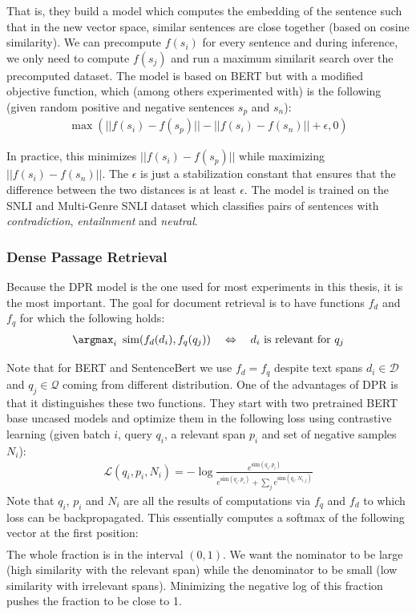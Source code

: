 That is, they build a model which computes the embedding of the sentence such that in the new vector space, similar sentences are close together (based on cosine similarity).
We can precompute $f(s_i)$ for every sentence and during inference, we only need to compute $f(s_j)$ and run a maximum similarit search over the precomputed dataset.
The model is based on BERT but with a modified objective function, which (among others experimented with) is the following (given random positive and negative sentences $s_p$ and $s_n$):
\begin{gather*}
    \max(||f(s_i)-f(s_p)||-||f(s_i)-f(s_n)||+\epsilon, 0)
\end{gather*}

In practice, this minimizes $||f(s_i)-f(s_p)||$ while maximizing $||f(s_i)-f(s_n)||$.
The $\epsilon$ is just a stabilization constant that ensures that the difference between the two distances is at least $\epsilon$.
The model is trained on the SNLI and Multi-Genre SNLI dataset which classifies pairs of sentences with \emph{contradiction}, \emph{entailnment} and \emph{neutral}. 

\subsubsection*{Dense Passage Retrieval}

Because the DPR model is the one used for most experiments in this thesis, it is the most important.
The goal for document retrieval is to have functions $f_d$ and $f_q$ for which the following holds:
\begin{gather*}
    \argmax_i \,\text{ sim}(f_d(d_i), f_q(q_j)) \quad\Leftrightarrow\quad d_i \text{ is relevant for } q_j
\end{gather*}

Note that for BERT and SentenceBert we use $f_d = f_q$ despite text spans $d_i \in \mathcal{D}$ and $q_j \in \mathcal{Q}$ coming from different distribution.
One of the advantages of DPR is that it distinguishes these two functions.
They start with two pretrained BERT base uncased models and optimize them in the following loss using contrastive learning (given batch $i$, query $q_i$, a relevant span $p_i$ and set of negative samples $N_i$):
\begin{gather*}
    \mathcal{L}(q_i, p_i, N_i) = -\log \frac{e^{\text{sim}(q_i,p_i)}}{e^{\text{sim}(q_i,p_i)} + \sum_j e^{\text{sim}(q_i,N_{i,j})}}
\end{gather*}
Note that $q_i$, $p_i$ and $N_i$ are all the results of computations via $f_q$ and $f_d$ to which loss can be backpropagated.
This essentially computes a softmax of the following vector at the first position:
\begin{gather*}
    [\text{sim}(q_i, p_i), \text{sim}(q_i, N_{i,1}), \text{sim}(q_i, N_{i,2}), \ldots, \text{sim}(q_i, N_{i,|N_i|})]
\end{gather*}
The whole fraction is in the interval $(0,1)$.
We want the nominator to be large (high similarity with the relevant span) while the denominator to be small (low similarity with irrelevant spans).
Minimizing the negative log of this fraction pushes the fraction to be close to 1.

